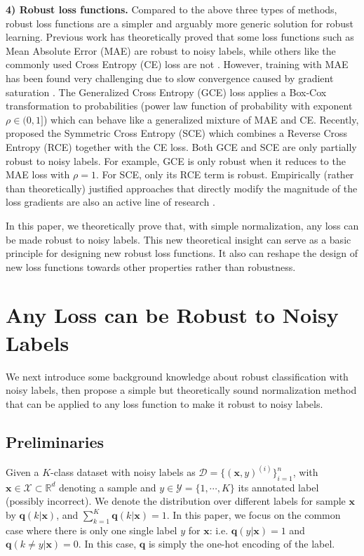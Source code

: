 \documentclass{article}
\def \xx {{\bm{x}}}
\def \qq {{\bm{q}}}
\def \X  {\mathcal{X}}
\def \Y  {\mathcal{Y}}
\begin{document}
\noindent\textbf{4) Robust loss functions.} 
Compared to the above three types of methods, robust loss functions are a simpler and arguably more generic solution for robust learning.
Previous work has theoretically proved that some loss functions such as Mean Absolute Error (MAE) are robust to noisy labels, while others like the commonly used Cross Entropy (CE) loss are not \cite{ghosh2017robust}.
However, training with MAE has been found very challenging due to slow convergence caused by gradient saturation \cite{zhang2018generalized}.
The Generalized Cross Entropy (GCE) loss \cite{zhang2018generalized} applies a Box-Cox transformation to probabilities (power law function of probability with exponent $\rho \in (0, 1]$) which can behave like a generalized mixture of MAE and CE. Recently, \citet{wang2019symmetric} proposed the Symmetric Cross Entropy (SCE) which combines a Reverse Cross Entropy (RCE) together with the CE loss.  Both GCE and SCE are only partially robust to noisy labels. For example, GCE is only robust when it reduces to the MAE loss with $\rho=1$. For SCE, only its RCE term is robust. Empirically (rather than theoretically) justified approaches that directly modify the magnitude of the loss gradients are also an active line of research \cite{wang2019imae, wang2019derivative}. 

In this paper, we theoretically prove that, with simple normalization, any loss can be made robust to noisy labels. This new theoretical insight can serve as a basic principle for designing new robust loss functions. It also can reshape the design of new loss functions towards other properties rather than robustness.

\section{Any Loss can be Robust to Noisy Labels}\label{sec:any_loss_robust}
We next introduce some background knowledge about robust classification with noisy labels, then propose a simple but theoretically sound normalization method that can be applied to any loss function to make it robust to noisy labels.

\subsection{Preliminaries}\label{sec:preliminary}
Given a $K$-class dataset with noisy labels as $\mathcal{D} = \{(\xx, y)^{(i)}\}_{i=1}^n$, with $\xx \in \X \subset \mathbb{R}^d$ denoting a sample and $y \in \Y = \{1, \cdots, K\}$ its annotated label (possibly incorrect).
We denote the distribution over different labels for sample $\xx$ by $\qq(k|\xx)$, and $\sum_{k=1}^{K}\qq(k|\xx)=1$. In this paper, we focus on the common case where there is only one single label $y$ for $\xx$: i.e. $\qq(y|\xx)=1$ and $\qq(k \neq y|\xx)=0$. In this case, $\qq$ is simply the one-hot encoding of the label.
\end{document}

